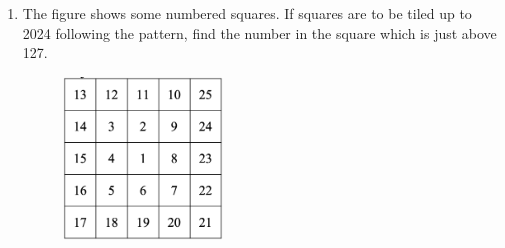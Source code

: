 \documentclass[11pt]{scrartcl}
\begin{document}
\begin{enumerate}
     \item The figure shows some numbered squares. If squares are to be tiled up to 2024 following the pattern, find the number in the square which is just above 127. 
    \begin{figure}[h]
        \centering
        \includegraphics[width=0.4\textwidth]{StarGen/0Figure/square-siput.png}
    \end{figure}
\end{enumerate}
\end{document}
